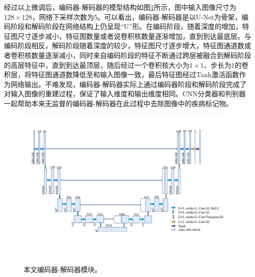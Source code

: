 经过以上微调后，编码器-解码器的模型结构如图\ref{fig:auto_encoder_architecture}所示，图中输入图像尺寸为$128\times 128$，网络下采样次数为5。可以看出，编码器-解码器是以U-Net为骨架，编码阶段和解码阶段在网络结构上仍呈现“U”形。在编码阶段，随着深度的增加，特征图尺寸逐步减小，特征图数量或者说卷积核数量逐渐增加，直到到达最底层。与编码阶段相反，解码阶段随着深度的较少，特征图尺寸逐步增大，特征图通道数或者卷积核数量逐渐减小，同时来自编码阶段的特征不断通过跨层被融合到解码阶段的高层特征中，直到到达最顶层，随后经过一个卷积核大小为$1\times 1$、步长为$1$的卷积层，将特征图通道数降低至和输入图像一致，最后特征图经过Tanh激活函数作为网络输出。不难发现，编码器-解码器实际上通过编码器阶段和解码阶段完成了对输入图像的重建过程，保证了输入维度和输出维度相同。CNN分类器和判别器一起帮助本来无监督的编码器-解码器在此过程中去除图像中的疾病标记物。
\begin{figure}[h]
	\centering
	\includegraphics[width=1.0\textwidth]{figure/auto_encoder_architecture}
	\caption[本文编码器-解码器模块]{本文编码器-解码器模块。}
	\label{fig:auto_encoder_architecture}
\end{figure}

